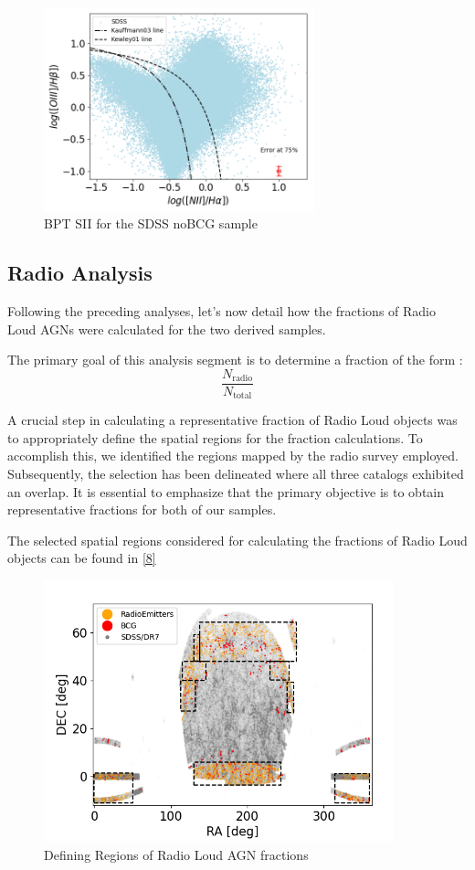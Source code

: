 \begin{figure}[hbtp]
  \centering
  \includegraphics[width=0.7\textwidth]{SDSS-NII-V22}
  \caption{BPT SII for the SDSS noBCG sample }
  \label{7}
\end{figure}

\newpage
\subsection{Radio Analysis}

Following the preceding analyses, let's now detail how the fractions of Radio Loud AGNs were calculated for the two derived samples.

The primary goal of this analysis segment is to determine a fraction of the form :
 $$\frac{N_{\text{radio}}}{N_{\text{total}}}$$

A crucial step in calculating a representative fraction of Radio Loud objects was to appropriately define the spatial regions for the fraction calculations. To accomplish this, we identified the regions mapped by the radio survey employed. Subsequently, the selection has been delineated where all three catalogs exhibited an overlap. It is essential to emphasize that the primary objective is to obtain representative fractions for both of our samples.

The selected spatial regions considered for calculating the fractions of Radio Loud objects can be found in \autoref{8}

\vspace{2cm}
\begin{figure}[hbtp]
  \centering
  \includegraphics[width=0.9\textwidth]{Fourth}
  \caption{Defining Regions of Radio Loud AGN fractions }
  \label{8}
\end{figure}


 
